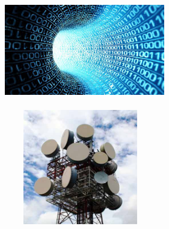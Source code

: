 \begin{titlepage}


 
 
\begin{center}
\setlength{\fboxsep}{2mm}
\setlength{\fboxrule}{2mm}
\end{center}

\vspace*{1.5cm}
\begin{center}
\begin {figure}[htbp]
  \hbox{ 
     \includegraphics[height=50mm,width=70mm]{intro2}%
     \hspace*{1cm}  %
     \includegraphics[height=50mm,width=70mm]{tel}
  }
\end {figure}
\end{center}



\end{titlepage}
